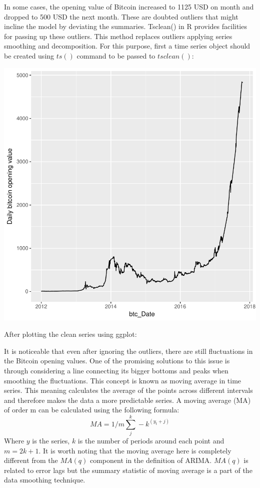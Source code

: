 \documentclass{article}
\begin{document}
In some cases, the opening value of Bitcoin increased to 1125 USD on month and dropped to 500 USD the next month. These are doubted outliers that might incline the model by deviating the summaries. Tsclean() in R provides facilities for passing up these outliers. This method replaces outliers applying series smoothing and decomposition. For this purpose, first a time series object should be created using $ts()$ command to be passed to $tsclean()$:
\begin{Schunk}
\end{Schunk}
\includegraphics{Report-010}

After plotting the clean series using ggplot:

It is noticeable that even after ignoring the outliers, there are still fluctuations in the Bitcoin opening values. One of the promising solutions to this issue is through considering a line connecting its bigger bottoms and peaks when smoothing the fluctuations. This concept is known as moving average in time series. This meaning calculates the average of the points across different intervals and therefore makes the data a more predictable series. 
A moving average (MA) of order m can be calculated using the following formula:
\[
MA=1/m \sum_{j}^{k}-k^(y_t+j) 
\]
Where $y$ is the series, $k$ is the number of periods around each point and $m=2k+1$.
It is worth noting that the moving average here is completely different from the $MA(q)$ component in the definition of ARIMA. $MA(q)$ is related to error lags but the summary statistic of moving average is a part of the data smoothing technique.
\end{document}
